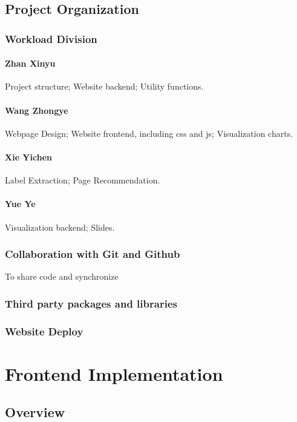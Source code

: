 \documentclass[a4paper, 10pt]{article}
\begin{document}
\subsection{Project Organization}
\subsubsection{Workload Division}
\paragraph{Zhan Xinyu} Project structure; Website backend; Utility functions.
\paragraph{Wang Zhongye} Webpage Design; Website frontend, including css and js; Visualization charts.
\paragraph{Xie Yichen} Label Extraction; Page Recommendation. 
\paragraph{Yue Ye} Visualization backend; Slides.
\subsubsection{Collaboration with Git and Github}
To share code and synchronize
\subsubsection{Third party packages and libraries}
\subsubsection{Website Deploy}
\section{Frontend Implementation}
\subsection{Overview}
\end{document}
